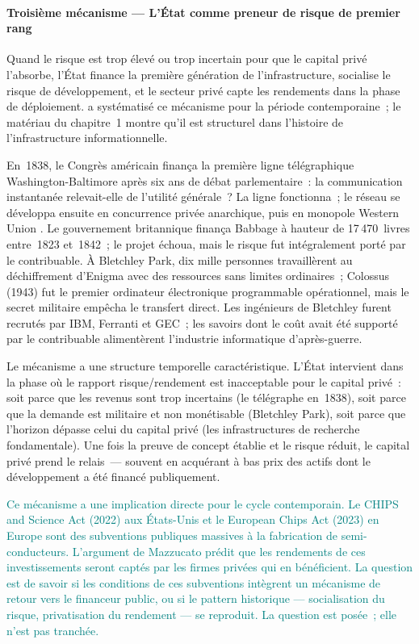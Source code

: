 \paragraph{Troisième mécanisme --- L'État comme preneur de risque de premier rang}

Quand le risque est trop élevé ou trop incertain pour que le capital privé l'absorbe, l'État finance la première génération de l'infrastructure, socialise le risque de développement, et le secteur privé capte les rendements dans la phase de déploiement. \textcite{mazzucato_entrepreneurial_2013} a systématisé ce mécanisme pour la période contemporaine~; le matériau du chapitre~1 montre qu'il est structurel dans l'histoire de l'infrastructure informationnelle.

En~1838, le Congrès américain finança la première ligne télégraphique Washington-Baltimore après six ans de débat parlementaire~: la communication instantanée relevait-elle de l'utilité générale~? La ligne fonctionna~; le réseau se développa ensuite en concurrence privée anarchique, puis en monopole Western Union \parencite{thompson_wiring_1947}. Le gouvernement britannique finança Babbage à hauteur de 17\,470~livres entre~1823 et~1842~; le projet échoua, mais le risque fut intégralement porté par le contribuable. À Bletchley Park, dix mille personnes travaillèrent au déchiffrement d'Enigma avec des ressources sans limites ordinaires~; Colossus (1943) fut le premier ordinateur électronique programmable opérationnel, mais le secret militaire empêcha le transfert direct. Les ingénieurs de Bletchley furent recrutés par IBM, Ferranti et GEC~; les savoirs dont le coût avait été supporté par le contribuable alimentèrent l'industrie informatique d'après-guerre.

Le mécanisme a une structure temporelle caractéristique. L'État intervient dans la phase où le rapport risque/rendement est inacceptable pour le capital privé~: soit parce que les revenus sont trop incertains (le télégraphe en~1838), soit parce que la demande est militaire et non monétisable (Bletchley Park), soit parce que l'horizon dépasse celui du capital privé (les infrastructures de recherche fondamentale). Une fois la preuve de concept établie et le risque réduit, le capital privé prend le relais~--- souvent en acquérant à bas prix des actifs dont le développement a été financé publiquement.

\textcolor{teal}{Ce mécanisme a une implication directe pour le cycle contemporain. Le CHIPS and Science Act (2022) aux États-Unis et le European Chips Act (2023) en Europe sont des subventions publiques massives à la fabrication de semi-conducteurs. L'argument de Mazzucato prédit que les rendements de ces investissements seront captés par les firmes privées qui en bénéficient. La question est de savoir si les conditions de ces subventions intègrent un mécanisme de retour vers le financeur public, ou si le pattern historique --- socialisation du risque, privatisation du rendement --- se reproduit. La question est posée~; elle n'est pas tranchée.}


